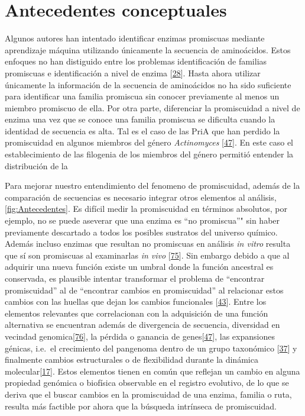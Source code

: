 \documentclass[12pt,twoside]{reedthesis}
\begin{document}
  \section{Antecedentes conceptuales}\label{antecedentes-conceptuales}
  
  Algunos autores han intentado identificar enzimas promiscuas mediante
  aprendizaje máquina utilizando únicamente la secuencia de aminoácidos.
  Estos enfoques no han distiguido entre los problemas identificación de
  familias promiscuas e identificación a nivel de enzima
  {[}\protect\hyperlink{ref-carbonell_molecular_2010}{28}{]}. Hasta ahora
  utilizar únicamente la información de la secuencia de aminoácidos no ha
  sido suficiente para identificar una familia promiscua sin conocer
  previamente al menos un miembro promiscuo de ella. Por otra parte,
  diferenciar la promiscuidad a nivel de enzima una vez que se conoce una
  familia promiscua se dificulta cuando la identidad de secuencia es alta.
  Tal es el caso de las PriA que han perdido la promiscuidad en algunos
  miembros del género \emph{Actinomyces}
  {[}\protect\hyperlink{ref-juarez-vazquez_evolution_2017}{47}{]}. En este
  caso el establecimiento de las filogenia de los miembros del género
  permitió entender la distribución de la
  
  Para mejorar nuestro entendimiento del fenomeno de promiscuidad, además
  de la comparación de secuencias es necesario integrar otros elementos al
  análisis,\autoref{fig:Antecedentes}. Es difícil medir la promiscuidad en
  términos absolutos, por ejemplo, no se puede aseverar que una enzima es
  ``no promiscua''" sin haber previamente descartado a todos los posibles
  sustratos del universo químico. Además incluso enzimas que resultan no
  promiscuas en análisis \emph{in vitro} resulta que sí son promiscuas al
  examinarlas \emph{in vivo}
  {[}\protect\hyperlink{ref-noda_tesis_2012}{75}{]}. Sin embargo debido a
  que al adquirir una nueva función existe un umbral donde la función
  ancestral es conservada, es plausible intentar transformar el problema
  de ``encontrar promiscuidad'' al de ``encontrar cambios en
  promiscuidad'' al relacionar estos cambios con las huellas que dejan los
  cambios funcionales
  {[}\protect\hyperlink{ref-soskine_mutational_2010}{43}{]}. Entre los
  elementos relevantes que correlacionan con la adquisición de una función
  alternativa se encuentran además de divergencia de secuencia, diversidad
  en vecindad
  genomica{[}\protect\hyperlink{ref-zhao__function_prediction_neighbourhood_2014}{76}{]},
  la pérdida o ganancia de
  genes{[}\protect\hyperlink{ref-juarez-vazquez_evolution_2017}{47}{]},
  las expansiones génicas, i.e.~el crecimiento del pangenoma dentro de un
  grupo taxonómico
  {[}\protect\hyperlink{ref-martinez-nunez_lifestyle_2015}{37}{]} y
  finalmente cambios estructurales o de flexibilidad durante la dinámica
  molecular{[}\protect\hyperlink{ref-zou_evolution_2015}{17}{]}. Estos
  elementos tienen en común que reflejan un cambio en alguna propiedad
  genómica o biofísica observable en el registro evolutivo, de lo que se
  deriva que el buscar cambios en la promiscuidad de una enzima, familia o
  ruta, resulta más factible por ahora que la búsqueda intrínseca de
  promiscuidad.
  
\end{document}
